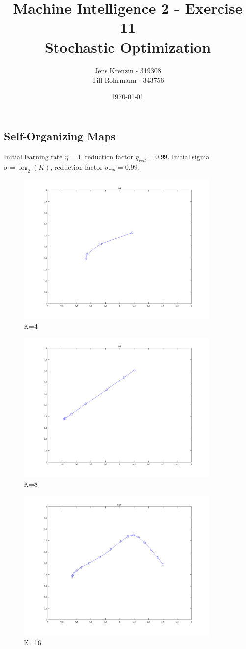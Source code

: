 \documentclass{article}
\title{Machine Intelligence 2 - Exercise 11\\
Stochastic Optimization}
\author{Jens Krenzin - 319308\\
Till Rohrmann - 343756}
\date{\today}
\begin{document}
	\maketitle
	\setcounter{section}{11}
	\setcounter{subsection}{1}
	\subsection{Self-Organizing Maps}
		Initial learning rate $\eta=1$, reduction factor $\eta_{red}=0.99$. Initial sigma $\sigma=\log_{2}(K)$, reduction factor $\sigma_{red}=0.99$.
		\begin{figure}[H]
			\includegraphics[width=10cm]{k4.png}
			\caption{K=4}
		\end{figure}
		\begin{figure}[H]
			\includegraphics[width=10cm]{k8.png}
			\caption{K=8}
		\end{figure}
		\begin{figure}[H]
			\includegraphics[width=10cm]{k16.png}
			\caption{K=16}
		\end{figure}
\end{document}
